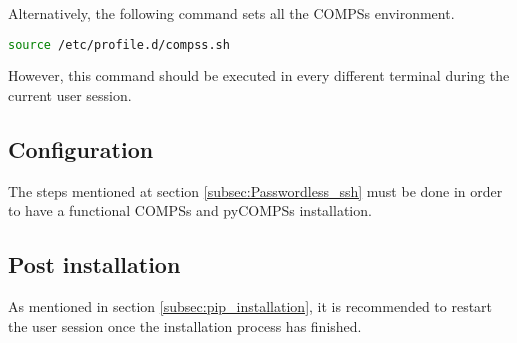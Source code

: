 Alternatively, the following command sets all the COMPSs environment.
\begin{lstlisting}[language=bash]
source /etc/profile.d/compss.sh
\end{lstlisting}
However, this command should be executed in every different terminal during the current user session.


\subsection{Configuration}
\label{subsec:pip_configuration}
The steps mentioned at section \ref{subsec:Passwordless_ssh} must be done in order to have a functional COMPSs and pyCOMPSs installation.


\subsection{Post installation}
As mentioned in section \ref{subsec:pip_installation}, it is recommended to restart the user session once the installation process has finished.